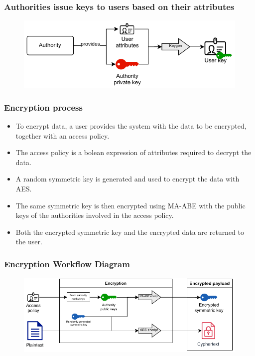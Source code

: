\documentclass{beamer}
\begin{document}
\begin{frame}
    \frametitle{Authorities issue keys to users based on their attributes}
    \begin{figure}
        \includegraphics[width=\textwidth,height=0.7\textheight,keepaspectratio]{images/diagrams/keygen_diagram.pdf}
    \end{figure}
\end{frame}

\begin{frame}
    \frametitle{Encryption process}
    \begin{itemize}
        \item To encrypt data, a user provides the system with the data to be encrypted, together with an access policy.
        \item The access policy is a bolean expression of attributes required to decrypt the data.
        \item A random symmetric key is generated and used to encrypt the data with AES.
        \item The same symmetric key is then encrypted using MA-ABE with the public keys of the authorities involved in the access policy.
        \item Both the encrypted symmetric key and the encrypted data are returned to the user.
    \end{itemize}
\end{frame}

\begin{frame}
    \frametitle{Encryption Workflow Diagram}
    \begin{figure}
        \includegraphics[width=\textwidth,height=0.7\textheight,keepaspectratio]{images/diagrams/encryption_diagram.pdf}
    \end{figure}
\end{frame}
\end{document}
